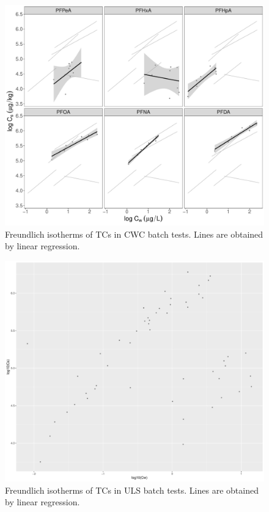 \begin{figure}
    \centering
    \includegraphics[width=\textwidth]{R/figs/CWC_facet_isotherm.pdf}
    \caption{Freundlich isotherms of TCs in CWC batch tests. Lines are obtained by linear regression.}
    \label{fig:CWC_isotherm2}
\end{figure}

\begin{figure}
    \centering
    \includegraphics[width=\textwidth]{R/figs/ULS_facet_isotherm.pdf}
    \caption{Freundlich isotherms of TCs in ULS batch tests. Lines are obtained by linear regression.}
    \label{fig:ULS_isotherm2}
\end{figure}

